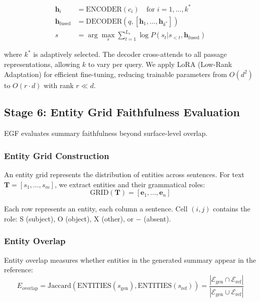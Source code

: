 \documentclass[11pt,a4paper]{article}
\begin{document}
\begin{align}
\mathbf{h}_i &= \text{ENCODER}(c_i) \quad \text{for } i = 1, \ldots, k^* \\
\mathbf{h}_{\text{fused}} &= \text{DECODER}(q, [\mathbf{h}_1, \ldots, \mathbf{h}_{k^*}])\\
s &= \arg\max_s \sum_{t=1}^{L_s} \log P(s_t | s_{<t}, \mathbf{h}_{\text{fused}})
\end{align}

where $k^*$ is adaptively selected. The decoder cross-attends to all passage representations, allowing $k$ to vary per query. We apply LoRA (Low-Rank Adaptation) \cite{hu2021lora} for efficient fine-tuning, reducing trainable parameters from $O(d^2)$ to $O(r \cdot d)$ with rank $r \ll d$.

\subsection{Stage 6: Entity Grid Faithfulness Evaluation}

EGF evaluates summary faithfulness beyond surface-level overlap.

\subsubsection{Entity Grid Construction}

An entity grid represents the distribution of entities across sentences. For text $\mathbf{T} = [s_1, \ldots, s_m]$, we extract entities and their grammatical roles:
\begin{equation}
\text{GRID}(\mathbf{T}) = [\mathbf{e}_1, \ldots, \mathbf{e}_n]
\end{equation}

Each row represents an entity, each column a sentence. Cell $(i, j)$ contains the role: $\text{S}$ (subject), $\text{O}$ (object), $\text{X}$ (other), or $-$ (absent).

\subsubsection{Entity Overlap}

Entity overlap measures whether entities in the generated summary appear in the reference:
\begin{equation}
E_{\text{overlap}} = \text{Jaccard}(\text{ENTITIES}(s_{\text{gen}}), \text{ENTITIES}(s_{\text{ref}})) = \frac{|\mathcal{E}_{\text{gen}} \cap \mathcal{E}_{\text{ref}}|}{|\mathcal{E}_{\text{gen}} \cup \mathcal{E}_{\text{ref}}|}
\end{equation}
\end{document}
